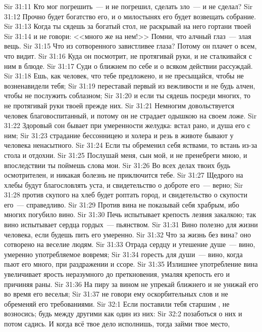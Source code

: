 \vs Sir 31:11 Кто мог погрешить~--- и не погрешил, сделать зло~--- и не сделал?
\vs Sir 31:12 Прочно будет богатство его, и о милостынях его будет возвещать собрание.
\rsbpar\vs Sir 31:13 Когда ты сядешь за богатый стол, не раскрывай на него гортани твоей
\vs Sir 31:14 и не говори: <<много же на нем!>> Помни, что алчный глаз~--- злая вещь.
\vs Sir 31:15 Что из сотворенного завистливее глаза? Потому он плачет о всем, что видит.
\vs Sir 31:16 Куда он посмотрит, не протягивай руки, и не сталкивайся с ним в блюде.
\vs Sir 31:17 Суди о ближнем по себе и о всяком действии рассуждай.
\vs Sir 31:18 Ешь, как человек, что тебе предложено, и не пресыщайся, чтобы не возненавидели тебя;
\vs Sir 31:19 переставай  первый из вежливости и не будь алчен, чтобы не послужить соблазном;
\vs Sir 31:20 и если ты сядешь посреди многих, то не протягивай руки твоей прежде них.
\vs Sir 31:21 Немногим довольствуется человек благовоспитанный, и потому он не страдает одышкою на своем ложе.
\vs Sir 31:22 Здоровый сон бывает при умеренности желудка: встал рано, и душа его с ним;
\vs Sir 31:23 страдание бессонницею и холера и резь в животе бывают у человека ненасытного.
\vs Sir 31:24 Если ты обременил себя яствами, то встань из-за стола и отдохни.
\vs Sir 31:25 Послушай меня, сын мой, и не пренебреги мною, и впоследствии ты поймешь слова мои.
\vs Sir 31:26 Во всех делах твоих будь осмотрителен, и никакая болезнь не приключится тебе.
\vs Sir 31:27 Щедрого на хлебы будут благословлять уста, и свидетельство о доброте его~--- верно;
\vs Sir 31:28 против скупого на хлеб будет роптать город, и свидетельство о скупости его~--- справедливо.
\vs Sir 31:29 Против вина не показывай себя храбрым, ибо многих погубило вино.
\vs Sir 31:30 Печь испытывает крепость лезвия закалкою; так вино испытывает сердца гордых~--- пьянством.
\vs Sir 31:31 Вино полезно для жизни человека, если будешь пить его умеренно.
\vs Sir 31:32 Что за жизнь без вина? оно сотворено на веселие людям.
\vs Sir 31:33 Отрада сердцу и утешение душе~--- вино, умеренно употребляемое вовремя;
\vs Sir 31:34 горесть для души~--- вино, когда пьют его много, при раздражении и ссоре.
\vs Sir 31:35 Излишнее употребление вина увеличивает ярость неразумного до преткновения, умаляя крепость его и причиняя раны.
\vs Sir 31:36 На пиру за вином не упрекай ближнего и не унижай его во время его веселья;
\vs Sir 31:37 не говори ему оскорбительных слов и не обременяй его требованиями.
\vs Sir 32:1 Если поставили тебя старшим , не возносись; будь между другими как один из них:
\vs Sir 32:2 позаботься о них и потом садись. И когда всё твое дело исполнишь, тогда займи твое место,
